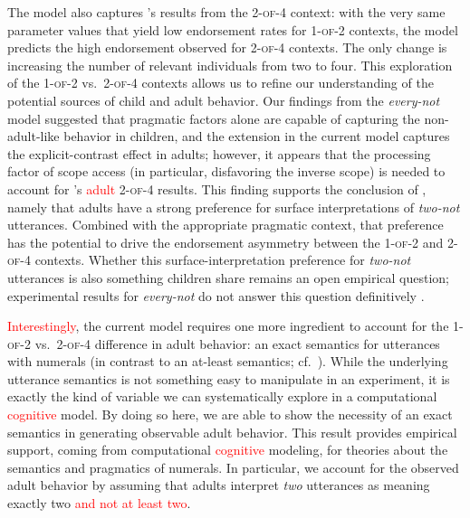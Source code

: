 \documentclass[preprint,authoryear]{elsarticle}\frenchspacing
\newcommand{\lp}[1]{\textcolor{red}{#1}} %
\begin{document}

The model also captures \citeauthor{musolinolidz2003}'s results from the \textsc{2-of-4} context: with the very same parameter values that yield low endorsement rates for \textsc{1-of-2} contexts, the model predicts the high endorsement observed for \textsc{2-of-4} contexts. The only change is increasing the number of relevant individuals from two to four. This exploration of the \textsc{1-of-2} vs.~\textsc{2-of-4} contexts allows us to refine our understanding of the potential sources of child and adult behavior. Our findings from the \emph{every-not} model suggested that pragmatic factors alone are capable of capturing the non-adult-like behavior in children, and the extension in the current model captures the explicit-contrast effect in adults; however, it appears that the processing factor of scope access (in particular, disfavoring the inverse scope) is needed to account for \citeauthor{musolinolidz2003}'s \lp{adult} \textsc{2-of-4} results. This finding supports the conclusion of \citeauthor{musolinolidz2003}, namely that adults have a strong preference for surface interpretations of \emph{two-not} utterances. Combined with the appropriate pragmatic context, that preference has the potential to drive the endorsement asymmetry between the \textsc{1-of-2} and \textsc{2-of-4} contexts. Whether this surface-interpretation preference for  \textit{two-not} utterances is also something children share remains an open empirical question; experimental results for \emph{every-not} do not answer this question definitively \citep{viauetal2010}.

\lp{Interestingly}, the current model requires one more ingredient to account for the \textsc{1-of-2} vs.~\textsc{2-of-4} difference in adult behavior: an {exact} semantics for utterances with numerals (in contrast to an {at-least} semantics; cf.~\citealp{geurts2006,breheny2008,spector2013,kennedy2015}). While the underlying utterance semantics is not something easy to manipulate in an experiment, it is exactly the kind of variable we can systematically explore in a computational \lp{cognitive} model. By doing so here, we are able to show the necessity of an {exact} semantics in generating observable adult behavior. This result provides empirical support, coming from computational \lp{cognitive} modeling, for theories about the semantics and pragmatics of numerals. In particular, we account for the observed adult behavior by assuming that adults interpret \textit{two} utterances as meaning {exactly} two \lp{and not at least two}.
\end{document}
